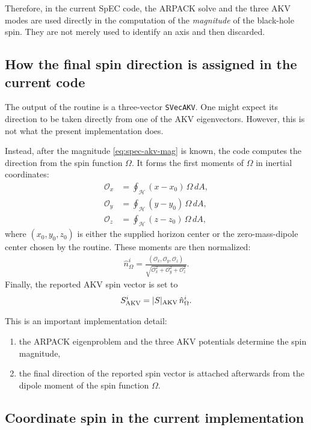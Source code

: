 Therefore, in the current SpEC code, the ARPACK solve and the three AKV modes are used directly in the computation of the \emph{magnitude} of the black-hole spin.  They are not merely used to identify an axis and then discarded.

\subsection{How the final spin direction is assigned in the current code}

The output of the routine is a three-vector \texttt{SVecAKV}.  One might expect its direction to be taken directly from one of the AKV eigenvectors.  However, this is not what the present implementation does.

Instead, after the magnitude \eqref{eq:spec-akv-mag} is known, the code computes the direction from the spin function $\Omega$.  It forms the first moments of $\Omega$ in inertial coordinates:
\begin{align}
\mathcal O_x &= \oint_{\mathcal H} (x-x_0)\, \Omega\, dA, \\
\mathcal O_y &= \oint_{\mathcal H} (y-y_0)\, \Omega\, dA, \\
\mathcal O_z &= \oint_{\mathcal H} (z-z_0)\, \Omega\, dA,
\end{align}
where $(x_0,y_0,z_0)$ is either the supplied horizon center or the zero-mass-dipole center chosen by the routine.  These moments are then normalized:
\begin{align}
\hat n_\Omega^i
  = \frac{(\mathcal O_x,\mathcal O_y,\mathcal O_z)}
         {\sqrt{\mathcal O_x^2+\mathcal O_y^2+\mathcal O_z^2}}.
\end{align}
Finally, the reported AKV spin vector is set to
\begin{align}
S_{\rm AKV}^i = |S|_{\rm AKV}\, \hat n_\Omega^i.
\label{eq:spec-final-spin-vector}
\end{align}

This is an important implementation detail:
\begin{enumerate}
\item the ARPACK eigenproblem and the three AKV potentials determine the spin magnitude,
\item the final direction of the reported spin vector is attached afterwards from the dipole moment of the spin function $\Omega$.
\end{enumerate}

\subsection{Coordinate spin in the current implementation}

